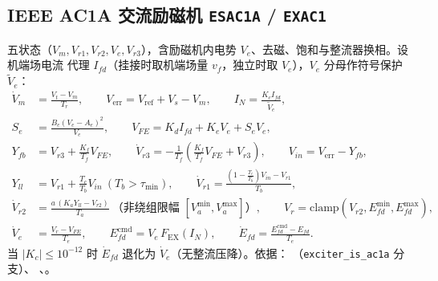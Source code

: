 \subsection{IEEE AC1A 交流励磁机 \texttt{ESAC1A} / \texttt{EXAC1}}
\label{sec:dynamics-exc-ac1a}
五状态（$V_m,V_{r1},V_{r2},V_e,V_{r3}$），含励磁机内电势 $V_e$、去磁、饱和与整流器换相。设机端场电流
代理 $I_{fd}$（挂接时取机端场量 $v_f$，独立时取 $V_e$），$V_e$ 分母作符号保护 $\tilde V_e$：
\begin{align}
 \dot V_m&=\frac{V_t-V_m}{T_r},\qquad V_{\mathrm{err}}=V_{\mathrm{ref}}+V_s-V_m,\qquad
 I_N=\frac{K_c I_{fd}}{\tilde V_e},\\
 S_e&=\frac{B_e(V_e-A_e)^2}{V_e},\qquad
 V_{FE}=K_d I_{fd}+K_e V_e+S_e V_e,\\
 Y_{fb}&=V_{r3}+\frac{K_f}{T_f}V_{FE},\qquad
 \dot V_{r3}=-\frac{1}{T_f}\!\left(\frac{K_f}{T_f}V_{FE}+V_{r3}\right),\qquad
 V_{in}=V_{\mathrm{err}}-Y_{fb},\\
 Y_{ll}&=V_{r1}+\frac{T_c}{T_b}V_{in}\ (T_b>\tau_{\min}),\qquad
 \dot V_{r1}=\frac{\left(1-\tfrac{T_c}{T_b}\right)V_{in}-V_{r1}}{T_b},\\
 \dot V_{r2}&=\frac{a\,(K_a Y_{ll}-V_{r2})}{T_a}\ \text{（非绕组限幅 }[V_a^{\min},V_a^{\max}]\text{）},\qquad
 V_r=\mathrm{clamp}(V_{r2},E_{fd}^{\min},E_{fd}^{\max}),\\
 \dot V_e&=\frac{V_r-V_{FE}}{T_e},\qquad
 E_{fd}^{\mathrm{cmd}}=V_e\,F_{\mathrm{EX}}(I_N),\qquad
 \dot E_{fd}=\frac{E_{fd}^{\mathrm{cmd}}-E_{fd}}{T_e}.
\end{align}
当 $|K_c|\le10^{-12}$ 时 $\dot E_{fd}$ 退化为 $\dot V_e$（无整流压降）。依据：
（\texttt{exciter\_is\_ac1a} 分支）、
、。

